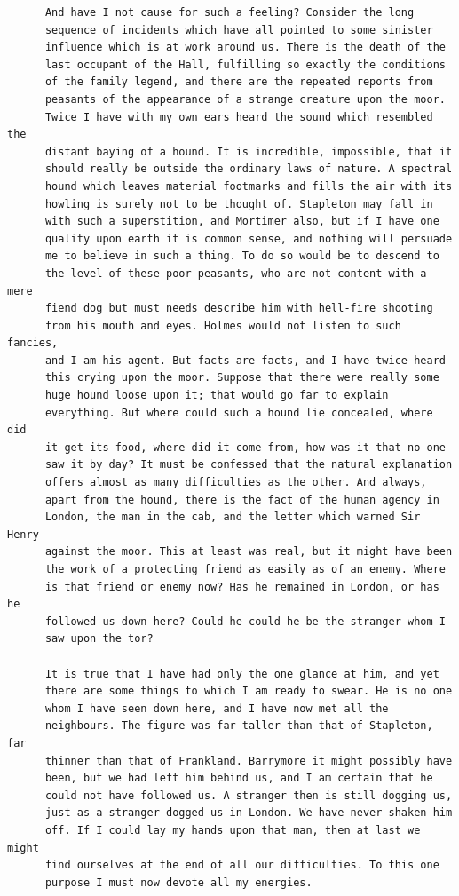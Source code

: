 \documentclass{article}
\begin{document}
\begin{verbatim}
      And have I not cause for such a feeling? Consider the long
      sequence of incidents which have all pointed to some sinister
      influence which is at work around us. There is the death of the
      last occupant of the Hall, fulfilling so exactly the conditions
      of the family legend, and there are the repeated reports from
      peasants of the appearance of a strange creature upon the moor.
      Twice I have with my own ears heard the sound which resembled the
      distant baying of a hound. It is incredible, impossible, that it
      should really be outside the ordinary laws of nature. A spectral
      hound which leaves material footmarks and fills the air with its
      howling is surely not to be thought of. Stapleton may fall in
      with such a superstition, and Mortimer also, but if I have one
      quality upon earth it is common sense, and nothing will persuade
      me to believe in such a thing. To do so would be to descend to
      the level of these poor peasants, who are not content with a mere
      fiend dog but must needs describe him with hell-fire shooting
      from his mouth and eyes. Holmes would not listen to such fancies,
      and I am his agent. But facts are facts, and I have twice heard
      this crying upon the moor. Suppose that there were really some
      huge hound loose upon it; that would go far to explain
      everything. But where could such a hound lie concealed, where did
      it get its food, where did it come from, how was it that no one
      saw it by day? It must be confessed that the natural explanation
      offers almost as many difficulties as the other. And always,
      apart from the hound, there is the fact of the human agency in
      London, the man in the cab, and the letter which warned Sir Henry
      against the moor. This at least was real, but it might have been
      the work of a protecting friend as easily as of an enemy. Where
      is that friend or enemy now? Has he remained in London, or has he
      followed us down here? Could he—could he be the stranger whom I
      saw upon the tor?

      It is true that I have had only the one glance at him, and yet
      there are some things to which I am ready to swear. He is no one
      whom I have seen down here, and I have now met all the
      neighbours. The figure was far taller than that of Stapleton, far
      thinner than that of Frankland. Barrymore it might possibly have
      been, but we had left him behind us, and I am certain that he
      could not have followed us. A stranger then is still dogging us,
      just as a stranger dogged us in London. We have never shaken him
      off. If I could lay my hands upon that man, then at last we might
      find ourselves at the end of all our difficulties. To this one
      purpose I must now devote all my energies.


\end{verbatim}
\end{document}
